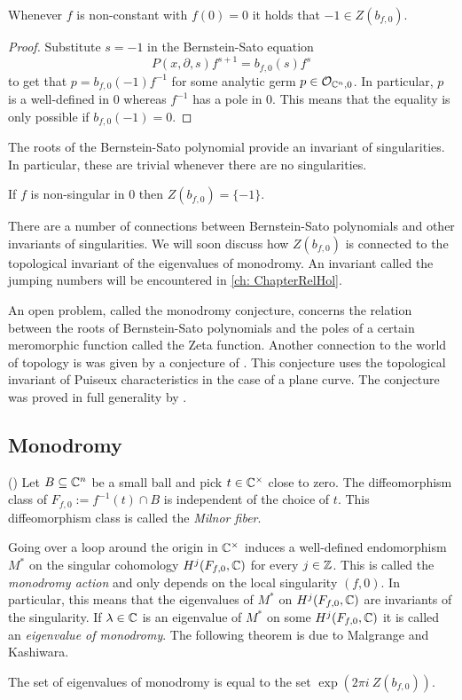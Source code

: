\begin{proposition}\label{prop: TrivialRoot}
  Whenever $f$ is non-constant with $f(0)=0$ it holds that $-1\in Z(b_{f,0}).$
\end{proposition}
\begin{proof}
  Substitute $s = -1$ in the Bernstein-Sato equation
  $$P(x,\partial,s)f^{s+1} = b_{f,0}(s)f^s $$
  to get that $p = b_{f,0}(-1)f^{-1}$ for some analytic germ $p\in \mathcal{O}_{\mathbb{C}^n,0}$.
  In particular,  $p$ is a well-defined in $0$ whereas $f^{-1}$ has a pole in $0$.
  This means that the equality is only possible if $b_{f,0}(-1)=0$.
\end{proof}
The roots of the Bernstein-Sato polynomial provide an invariant of singularities.
In particular, these are trivial whenever there are no singularities.
\begin{proposition}{\cite[Section 4.2]{igusa2007introduction}}
  If $f$ is non-singular in $0$ then $Z(b_{f,0}) = \{-1\}$.
\end{proposition}
\begin{remark}
  There are a number of connections between Bernstein-Sato polynomials and other invariants of singularities.
  We will soon discuss how $Z(b_{f,0})$ is connected to the topological invariant of the eigenvalues of monodromy.
  An invariant called the jumping numbers will be encountered in \cref{ch: ChapterRelHol}.

  An open problem, called the monodromy conjecture, concerns the relation between the roots of Bernstein-Sato polynomials and the poles of a certain meromorphic function called the Zeta function.
  Another connection to the world of topology is was given by a conjecture of \cite{yano1982exponents}.
  This conjecture uses the topological invariant of Puiseux characteristics in the case of a plane curve.
  The conjecture was proved in full generality by \cite{blanco2019yano}.
\end{remark}

\subsection{Monodromy}
\begin{theorem}{(\cite{milnor1968singular})}
  Let $B\subseteq \mathbb{C}^n$ be a small ball and pick $t\in \mathbb{C}^\times$ close to zero.
  The diffeomorphism class of $F_{f,0} := f^{-1}(t)\cap B $  is independent of the choice of $t$.
  This diffeomorphism class is called the {\it Milnor fiber}.
\end{theorem}
Going over a loop around the origin in $\mathbb{C}^\times$ induces a well-defined endomorphism $M^*$ on the singular cohomology $H^j(F_{f,0},\mathbb{C})$ for every $j\in \mathbb{Z}$.
This is called the {\it monodromy action} and only depends on the local singularity $(f,0)$.
In particular, this means that the eigenvalues of $M^*$ on $H^j(F_{f,0},\mathbb{C})$ are invariants of the singularity.
If $\lambda \in \mathbb{C}$ is an eigenvalue of $M^*$ on some $H^j(F_{f,0},\mathbb{C})$ it is called an {\it eigenvalue of monodromy}.
The following theorem is due to Malgrange and Kashiwara.
\begin{theorem}\label{thm: EigMonodromy}
The set of eigenvalues of monodromy is equal to the set $\exp(2\pi i\ Z(b_{f,0}))$.
\end{theorem}

